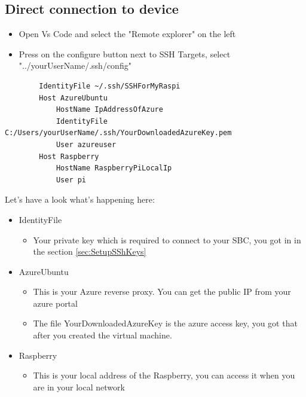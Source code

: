 \documentclass[a4paper,12pt]{article}
\begin{document}
	\subsection{Direct connection to device}
	\begin{itemize}
		\item Open Vs Code and select the "Remote explorer" on the left
		\item Press on the configure button next to SSH Targets, select "../yourUserName/.ssh/config"
	\end{itemize}
	\begin{verbatim}
		IdentityFile ~/.ssh/SSHForMyRaspi
		Host AzureUbuntu
			HostName IpAddressOfAzure
			IdentityFile C:/Users/yourUserName/.ssh/YourDownloadedAzureKey.pem
			User azureuser
		Host Raspberry
			HostName RaspberryPiLocalIp
			User pi
	\end{verbatim}
	Let's have a look what's happening here:
	\begin{itemize}
		\item IdentityFile
		\begin{itemize}
			\item Your private key which is required to connect to your SBC, you got in in the section \ref{sec:SetupSShKeys}
		\end{itemize}
		\item AzureUbuntu
		\begin{itemize}
			\item This is your Azure reverse proxy. You can get the public IP from your azure portal
			\item The file YourDownloadedAzureKey is the azure access key, you got that after you created the virtual machine.
		\end{itemize}
		\item Raspberry
		\begin{itemize}
			\item This is your local address of the Raspberry, you can access it when you are in your local network
		\end{itemize}
	\end{itemize}
\end{document}
